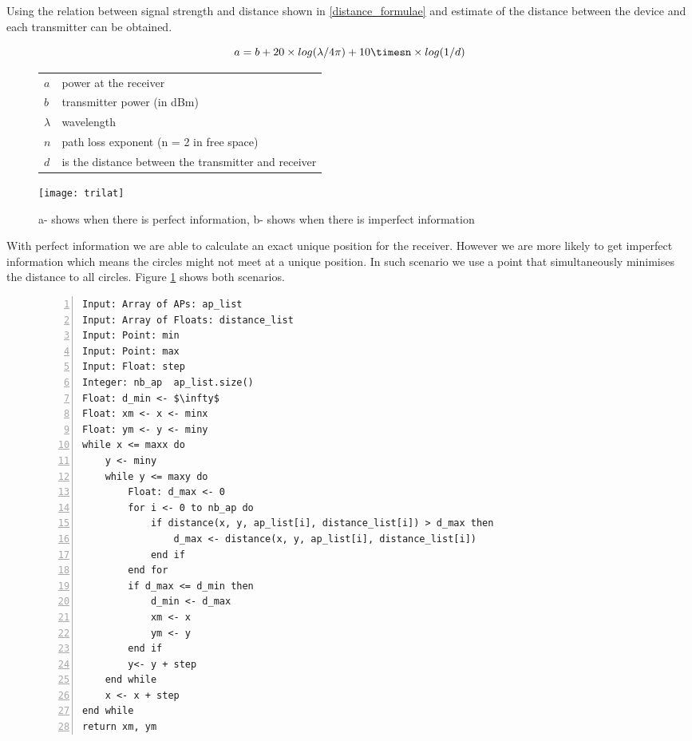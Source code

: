 Using the relation between signal strength and distance shown in \eqref{distance_formulae} and estimate of the distance between the device and each transmitter can be obtained.
\begin{figure}[h]
\begin{equation} \label{distance_formulae}
\centering
a = b+20\times log(\lambda/4 \pi) + 10\timesn\times log(1/d)
\end{equation}
\begin{tabular}{@{}>{$}l<{$}l@{}}
    a & power at the receiver\\
    b & transmitter power (in dBm)\\
    \lambda &  wavelength\\
    n & path loss exponent (n = 2 in free space)\\
    d & is the distance between the transmitter and receiver
  \end{tabular}
\end{figure}
\begin{figure}
\centering
\texttt{[image: trilat]}
\caption{a- shows when there is perfect information, b- shows when there is imperfect information}
\label{trilat_image}
\end{figure}
With perfect information we are able to calculate an exact unique position for the receiver. However we are more likely to get imperfect information which means the circles might not meet at a unique position. In such scenario we use a point that simultaneously minimises the distance to all circles. Figure \ref{trilat_image} shows both scenarios.
\begin{figure}[H]
\begin{lstlisting}[caption = {Algorithm for Trilateration\cite{sig-cart}},frame=single,mathescape, captionpos=b,numbers=left,numbersep=5pt,label={psuedo-code}]
Input: Array of APs: ap_list
Input: Array of Floats: distance_list
Input: Point: min
Input: Point: max
Input: Float: step
Integer: nb_ap  ap_list.size()
Float: d_min <- $\infty$
Float: xm <- x <- minx
Float: ym <- y <- miny
while x <= maxx do
    y <- miny
    while y <= maxy do
        Float: d_max <- 0
        for i <- 0 to nb_ap do
            if distance(x, y, ap_list[i], distance_list[i]) > d_max then
                d_max <- distance(x, y, ap_list[i], distance_list[i])
            end if
        end for
        if d_max <= d_min then
            d_min <- d_max
            xm <- x
            ym <- y
        end if
        y<- y + step
    end while
    x <- x + step
end while
return xm, ym
\end{lstlisting}
\end{figure}

